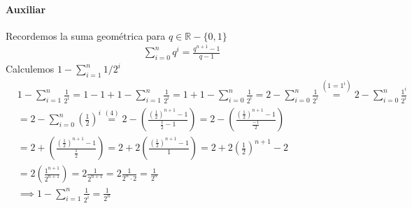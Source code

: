 \begin{enumerate}[label=\roman*)]
    \paragraph{Auxiliar}{Recordemos la suma geométrica para $q \in \mathbb{R}-\{0,1\}$
        \begin{align}
            \sum_{i=0}^{n}q^i = \frac{q^{n+1} - 1}{q-1}
        \end{align}
        Calculemos $1 - \sum_{i=1}^{n}1/2^i$
        \begin{align*}
            &1 - \sum_{i=1}^{n}\frac{1}{2^i} = 1 - 1 + 1 - \sum_{i=1}^{n}\frac{1}{2^i} 
            = 1 + 1 - \sum_{i=0}^{n}\frac{1}{2^i}  = 2 - \sum_{i=0}^{n}\frac{1}{2^i}
            \overset{(1 = 1^i)}{=} 2 - \sum_{i=0}^{n}\frac{1^i}{2^i} \\
            &= 2 - \sum_{i=0}^{n}\left(\frac{1}{2}\right)^i
            \overset{(4)}{=} 2 - \left(\frac{\left(\displaystyle\frac{1}{2}\right)^{n+1} - 1}{\displaystyle \frac{1}{2} - 1}\right)
            = 2 - \left(\frac{\left(\displaystyle\frac{1}{2}\right)^{n+1} - 1}{\displaystyle \frac{-1}{2}}\right) \\
            &= 2 + \left(\frac{\left(\displaystyle\frac{1}{2}\right)^{n+1} - 1}{\displaystyle \frac{1}{2}}\right)
            = 2 + 2\left(\frac{\left(\displaystyle\frac{1}{2}\right)^{n+1} - 1}{1}\right)
            = 2 + 2\left(\frac{1}{2}\right)^{n+1} - 2 \\
            &= 2\left(\frac{1^{n+1}}{2^{n+1}}\right) = 2 \frac{1}{2^{n+1}} = 2\frac{1}{2^n \cdot 2} = \frac{1}{2^n} \\
            &\implies 1 - \sum_{i=1}^{n}\frac{1}{2^i} = \frac{1}{2^n}
        \end{align*}
    }


\end{enumerate}
